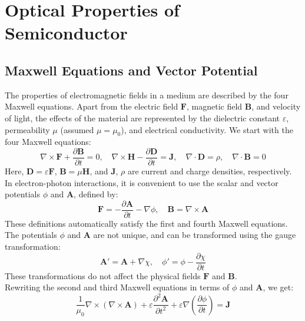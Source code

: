 \chapter{Optical Properties of Semiconductor}
\section{Maxwell Equations and Vector Potential}
The properties of electromagnetic fields in a medium are described by the four Maxwell equations. Apart from the electric field \( \mathbf{F} \), magnetic field \( \mathbf{B} \), and velocity of light, the effects of the material are represented by the dielectric constant \( \varepsilon \), permeability \( \mu \) (assumed \( \mu = \mu_0 \)), and electrical conductivity.
We start with the four Maxwell equations:
\begin{equation}
	\nabla \times \mathbf{F} + \frac{\partial \mathbf{B}}{\partial t} = 0, \quad
	\nabla \times \mathbf{H} - \frac{\partial \mathbf{D}}{\partial t} = \mathbf{J}, \quad
	\nabla \cdot \mathbf{D} = \rho, \quad
	\nabla \cdot \mathbf{B} = 0
\end{equation}
Here, \( \mathbf{D} = \varepsilon \mathbf{F} \), \( \mathbf{B} = \mu \mathbf{H} \), and \( \mathbf{J} \), \( \rho \) are current and charge densities, respectively.
In electron-photon interactions, it is convenient to use the scalar and vector potentials \( \phi \) and \( \mathbf{A} \), defined by:
\begin{equation}
	\mathbf{F} = -\frac{\partial \mathbf{A}}{\partial t} - \nabla \phi, \quad
	\mathbf{B} = \nabla \times \mathbf{A}
\end{equation}
These definitions automatically satisfy the first and fourth Maxwell equations. The potentials \( \phi \) and \( \mathbf{A} \) are not unique, and can be transformed using the gauge transformation:
\begin{equation}
	\mathbf{A}' = \mathbf{A} + \nabla \chi, \quad \phi' = \phi - \frac{\partial \chi}{\partial t}
\end{equation}
These transformations do not affect the physical fields \( \mathbf{F} \) and \( \mathbf{B} \).\\
Rewriting the second and third Maxwell equations in terms of \( \phi \) and \( \mathbf{A} \), we get:
\begin{equation}
	\frac{1}{\mu_0} \nabla \times (\nabla \times \mathbf{A}) + \varepsilon \frac{\partial^2 \mathbf{A}}{\partial t^2} + \varepsilon \nabla \left( \frac{\partial \phi}{\partial t} \right) = \mathbf{J}
\end{equation}
